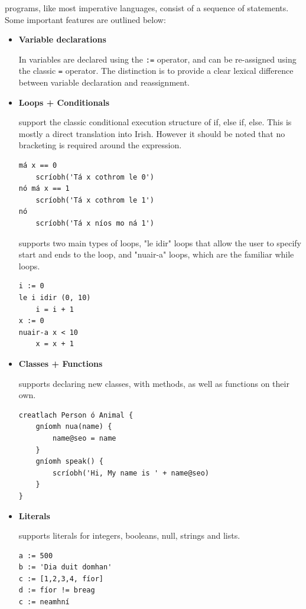 \Setanta{} programs, like most imperative languages, consist of a sequence of statements. Some important \Setanta{} features are outlined below:
\begin{itemize}
    \item \textbf{Variable declarations}

        In \Setanta{} variables are declared using the \verb|:=| operator, and can be re-assigned using the classic \verb|=| operator. The distinction is to provide a clear lexical difference between variable declaration and reassignment.
    \item \textbf{Loops + Conditionals}

        \Setanta{} support the classic conditional execution structure of if, else if, else. This is mostly a direct translation into Irish. However it should be noted that no bracketing is required around the expression.

            \begin{lstlisting}[language=setanta, frame=single, caption=Setanta conditionals]
má x == 0
    scríobh('Tá x cothrom le 0')
nó má x == 1
    scríobh('Tá x cothrom le 1')
nó
    scríobh('Tá x níos mo ná 1')
            \end{lstlisting}

            \Setanta{} supports two main types of loops, "le idir" loops that allow the user to specify start and ends to the loop, and "nuair-a" loops, which are the familiar while loops.

            \begin{lstlisting}[language=setanta, frame=single, caption=Setanta loops]
i := 0
le i idir (0, 10)
    i = i + 1
x := 0
nuair-a x < 10
    x = x + 1
            \end{lstlisting}
        \item \textbf{Classes + Functions}

            \Setanta{} supports declaring new classes, with methods, as well as functions on their own.
            \begin{lstlisting}[language=setanta, frame=single, caption=Setanta classes]
creatlach Person ó Animal {
    gníomh nua(name) {
        name@seo = name
    }
    gníomh speak() {
        scríobh('Hi, My name is ' + name@seo)
    }
}
            \end{lstlisting}
        \item \textbf{Literals}

            \Setanta{} supports literals for integers, booleans, null, strings and lists.
            \begin{lstlisting}[language=setanta, frame=single, caption=Setanta literals]
a := 500
b := 'Dia duit domhan'
c := [1,2,3,4, fíor]
d := fíor != breag
c := neamhní
            \end{lstlisting}
\end{itemize}

